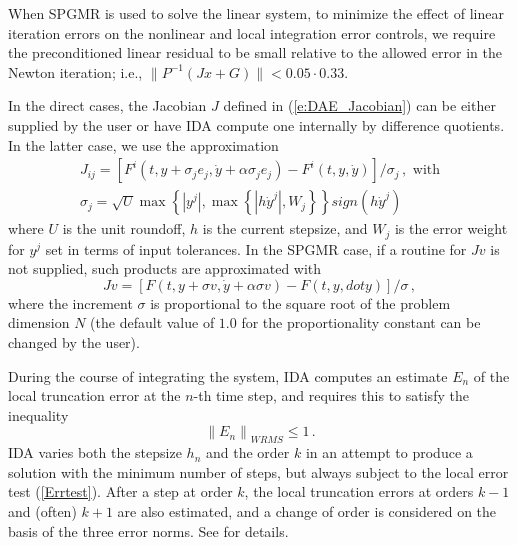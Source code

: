 When SPGMR is used to solve the linear system, to minimize the effect of
linear iteration errors on the nonlinear and local integration error controls,
we require the preconditioned linear residual to be small relative to the 
allowed error in the Newton iteration; i.e., 
$\| P^{-1}(Jx+G) \| < 0.05 \cdot 0.33$.

In the direct cases, the Jacobian $J$ defined in (\ref{e:DAE_Jacobian}) 
can be either supplied by the user or have IDA compute one internally 
by difference quotients. In the latter case, we use the approximation
\begin{gather*}
  J_{ij} = [F^i(t,y+\sigma_j e_j,{\dot y}+\alpha\sigma_j e_j) - 
  F^i(t,y,{\dot y})]/\sigma_j \, , \text{ with}\\
  \sigma_j = \sqrt{U} \max \left\{ |y^j|, 
    \max \left\{ |h{\dot y}^j|,W_j \right\}\right\} sign(h {\dot y}^j)
\end{gather*}
where $U$ is the unit roundoff, $h$ is the current stepsize, and $W_j$ is 
the error weight for $y^j$ set in terms of input tolerances. 
%
In the SPGMR case, if a routine for $Jv$ is not supplied, such products are
approximated with
\begin{equation*}
Jv = [F(t,y+\sigma v,{\dot y}+\alpha\sigma v) - F(t,y,{dot y})]/\sigma \, ,
\end{equation*}
where the increment $\sigma$ is proportional to the square root of the problem 
dimension $N$ (the default value of $1.0$ for the proportionality constant can 
be changed by the user).

During the course of integrating the system, IDA computes an estimate
$E_n$ of the local truncation error at the $n$-th time step, and
requires this to satisfy the inequality
\begin{equation}\label{Errtest}
  \left\| E_n\right\|_{WRMS} \le 1 \, .               
\end{equation}
%
IDA varies both the stepsize $h_n$ and the order $k$ in an attempt to
produce a solution with the minimum number of steps, but always
subject to the local error test (\ref{Errtest}).  After a step at
order $k$, the local truncation errors at orders $k-1$ and (often)
$k+1$ are also estimated, and a change of order is considered on the
basis of the three error norms.  See \cite{BCP:96} for details.  


